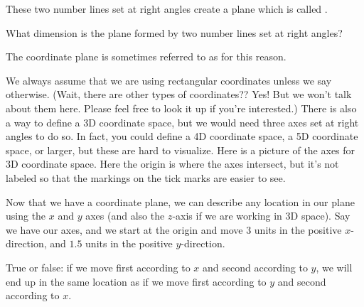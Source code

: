 \documentclass{ximera}
\begin{document}
These two number lines set at right angles create a plane which is called . 
\begin{question}
What dimension is the plane formed by two number lines set at right angles?
\begin{multipleChoice}
\end{multipleChoice}
\begin{feedback}[correct]
The coordinate plane is sometimes referred to as  for this reason.
\end{feedback}
\end{question}
We always assume that we are using rectangular coordinates unless we say otherwise. (Wait, there are other types of coordinates?? Yes! But we won't talk about them here. Please feel free to look it up if you're interested.) There is also a way to define a 3D coordinate space, but we would need three axes set at right angles to do so. In fact, you could define a 4D coordinate space, a 5D coordinate space, or larger, but these are hard to visualize. Here is a picture of the axes for 3D coordinate space. Here the origin is where the axes intersect, but it's not labeled so that the markings on the tick marks are easier to see.
\begin{image}
\end{image}


Now that we have a coordinate plane, we can describe any location in our plane using the $x$ and $y$ axes (and also the $z$-axis if we are working in 3D space). Say we have our axes, and we start at the origin and move $3$ units in the positive $x$-direction, and $1.5$ units in the positive $y$-direction.
\begin{question}
True or false: if we move first according to $x$ and second according to $y$, we will end up in the same location as if we move first according to $y$ and second according to $x$.
\begin{multipleChoice}
\end{multipleChoice}
\end{question}
\end{document}
